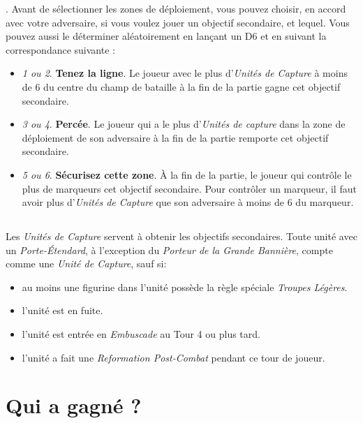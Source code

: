 . Avant de sélectionner les zones de déploiement, vous pouvez choisir, en accord avec votre adversaire, si vous voulez jouer un objectif secondaire, et lequel. Vous pouvez aussi le déterminer aléatoirement en lançant un D6 et en suivant la correspondance suivante :
\begin{itemize}
\item \emph{1 ou 2}. \textbf{Tenez la ligne}. Le joueur avec le plus d'\emph{Unités de Capture} à moins de \unit{6}{\pouce} du centre du champ de bataille à la fin de la partie gagne cet objectif secondaire.
\item \emph{3 ou 4}. \textbf{Percée}. Le joueur qui a le plus d'\emph{Unités de capture} dans la zone de déploiement de son adversaire à la fin de la partie remporte cet objectif secondaire.
\item \emph{5 ou 6}. \textbf{Sécurisez cette zone}. À la fin de la partie, le joueur qui contrôle le plus de marqueurs cet objectif secondaire. Pour contrôler un marqueur, il faut avoir plus d'\emph{Unités de Capture} que son adversaire à moins de \unit{6}{\pouce} du marqueur.
\end{itemize}

\subsection{}

Les \emph{Unités de Capture} servent à obtenir les objectifs secondaires. Toute unité avec un \emph{Porte-Étendard}, à l'exception du \emph{Porteur de la Grande Bannière}, compte comme une \emph{Unité de Capture}, sauf si:
\begin{itemize}
\item au moins une figurine dans l'unité possède la règle spéciale \emph{Troupes Légères}.
\item l'unité est en fuite.
\item l'unité est entrée en \emph{Embuscade} au Tour 4 ou plus tard.
\item l'unité a fait une \emph{Reformation Post-Combat} pendant ce tour de joueur.
\end{itemize}

\section{Qui a gagné ?}

